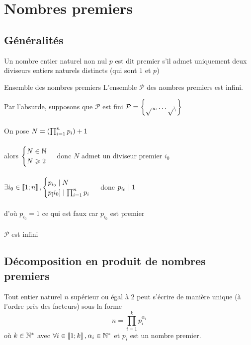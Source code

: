 \section{Nombres premiers}
\subsection{Généralités}
\begin{defi}
	Un nombre entier naturel non nul \(p\) est dit premier s’il admet uniquement deux diviseurs entiers naturels distincts (qui sont \(1\) et \(p\))
\end{defi}

\begin{defprop}
	Ensemble des nombres premiers
	L’ensemble \(\mathcal{P}\) des nombres premiers est infini.
\end{defprop}
\begin{dem}
	Par l'absurde, supposons que \(\mathcal{P}\) est fini \cad \(\mathcal{P = \left\lbrace p_1 \dots p_n\right\rbrace}\)\\~\\
	On pose \(N = \left(\prod_{i = 1}^{n} p_i\right) + 1\)\\~\\
	alors \(\begin{cases}
		N \in \mathbb{N} \\
		N \geqslant 2
	\end{cases}\) donc \(N\) admet un diviseur premier \(i_0\) \\~\\
	\(\exists i_0 \in \left\llbracket1;n\right\rrbracket , \begin{cases}
		p_{i_0} \mid N \\
		p_[i_0] \mid \prod_{i=1}^{n} p_i
	\end{cases}\) donc \(p_{i_0} \mid 1\)\\~\\
	d'où \(p_{i_0} = 1\) ce qui est faux car \(p_{i_0}\) est premier\\~\\
	\conclusion \(\mathcal{P}\) est infini
\end{dem}
\subsection{Décomposition en produit de nombres premiers}

\begin{theo}
	Tout entier naturel \(n\) supérieur ou égal à \(2\) peut s’écrire de manière unique (à l’ordre près des facteurs) sous la forme
	\[n = \prod_{i=1}^{k} p_i^{\alpha_i}\]
	où \(k \in \mathbb{N}^*\) avec \(\forall i \in \left\llbracket1;k\right\rrbracket , \alpha_i \in \mathbb{N}^*\) et \(p_i\) est un nombre premier.
\end{theo}

